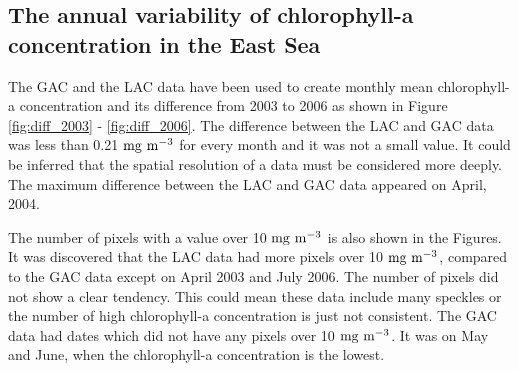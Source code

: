 \subsection{The annual variability of chlorophyll-a concentration in the East Sea}
 
The GAC and the LAC data have been used to create monthly mean chlorophyll-a concentration and its difference from 2003 to 2006 as shown in Figure \ref{fig:diff_2003} - \ref{fig:diff_2006}. The difference between the LAC and GAC data was less than 0.21 $\rm mg~m^{-3}$ for every month and it was not a small value. It could be inferred that the spatial resolution of a data must be considered more deeply. The maximum difference between the LAC and GAC data appeared on April, 2004. 
  
 The number of pixels with a value over 10 $\rm mg~m^{-3}$ is also shown in the Figures. It was discovered that the LAC data had more pixels over 10 $\rm mg~m^{-3}$, compared to the GAC data except on April 2003 and July 2006. The number of pixels did not show a clear tendency. This could mean these data include many speckles or the number of high chlorophyll-a concentration is just not consistent. The GAC data had dates which did not have any pixels over 10 $\rm mg~m^{-3}$. It was on May and June, when the chlorophyll-a concentration is the lowest. 




